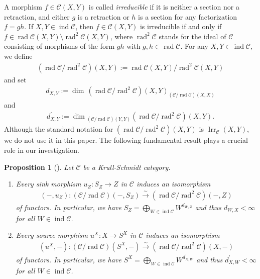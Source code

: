 \documentclass[12pt]{amsart}
\numberwithin{equation}{subsection}
\theoremstyle{plain}
\newtheorem{proposition}[theorem]{Proposition}
\theoremstyle{definition}
\newcommand{\rad}{\operatorname{rad}}
\newcommand{\Irr}{\operatorname{Irr}}
\newcommand{\ind}{\operatorname{ind}}
\newcommand{\C}{\mathcal{C}}
\begin{document}
A morphism $f\in\C(X, Y)$ is called  {\it irreducible} if it is neither a section nor a retraction, and either $g$ is a retraction or $h$ is a section for any factorization $f=gh$.
If $X, Y \in\ind\C$, then $f\in\C(X, Y)$ is irreducible if and only if $f\in \rad\C(X, Y)\setminus\rad^2\C(X, Y)$, where $\rad^2\C$ stands for the ideal of $\C$ consisting of morphisms of the form $gh$ with $g, h\in\rad\C$. 
For any $X, Y \in \ind\C$, 
we define
\begin{align}
    (\rad\C/\rad^2\C)(X, Y):= \rad\C(X, Y)/\rad^{2}\C(X, Y)
\end{align}
and set 
\begin{align}\label{eq_2}
d_{X,Y}:=\dim\,(\rad\C/\rad^2\C)(X, Y)_{(\C/\rad\C)(X,X)}
\end{align}
and
\begin{align}\label{eq_3}
d_{X,Y}^\prime := \dim  {}_{(\C/\rad\C)(Y,Y)}(\rad\C/\rad^2\C)(X, Y).
\end{align}
Although the standard notation for $(\rad\C/\rad^2\C)(X, Y)$ is $\Irr_\C(X,Y)$, we do not use it in this paper.
The following fundamental result plays a crucial role in our investigation.



\begin{proposition}[{\cite[Proposition 3.12]{Iyama-Nakaoka-Palu_2024}}]
Let $\C$ be a Krull-Schmidt category.
\begin{enumerate}
\item Every sink morphism $u_Z:S_Z \to  Z$ in $\C$ induces an isomorphism 
\begin{align}
    (-, u_Z) : (\C/\rad\C)(-, S_Z) \xrightarrow{\sim} (\rad\C/\rad^2\C)(-,Z)
\end{align}
of functors. 
In particular, we have $S_Z = \bigoplus_{W\in\ind\C}W^{d_{W,Z}}$ and thus $d_{W,X}<\infty$ for all $W\in\ind\C$.
\item Every source morphism $u^X:X \to S^X$ in $\C$ induces an isomorphism 
\begin{align}
    (u^X, -) : (\C/\rad\C)(S^X, -) \xrightarrow{\sim} (\rad\C/\rad^2\C)(X, -)
\end{align}
of functors. 
In particular, we have $S^X = \bigoplus_{W\in\ind\C}W^{d_{X,W}^\prime}$ and thus $d_{X,W}^\prime<\infty$ for all $W\in\ind\C$.
\end{enumerate}    
\end{proposition}
\end{document}
